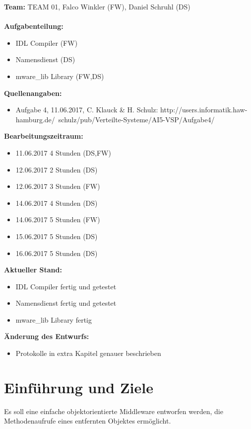 \documentclass{article}
\begin{document}
\textbf{Team:} TEAM 01, Falco Winkler (FW), Daniel Schruhl (DS)\\
\\
\textbf{Aufgabenteilung:}
\begin{itemize}
    \item IDL Compiler (FW)
    \item Namensdienst (DS)
    \item mware\_lib Library (FW,DS)
\end{itemize}

\textbf{Quellenangaben:}
\begin{itemize}
    \item Aufgabe 4, 11.06.2017, C. Klauck \& H. Schulz: \newline
    http://users.informatik.haw-hamburg.de/~schulz/pub/Verteilte-Systeme/AI5-VSP/Aufgabe4/
\end{itemize}

\textbf{Bearbeitungszeitraum:}
\begin{itemize}
	\item 11.06.2017 4 Stunden (DS,FW)
	\item 12.06.2017 2 Stunden (DS)
	\item 12.06.2017 3 Stunden (FW)
	\item 14.06.2017 4 Stunden (DS)
	\item 14.06.2017 5 Stunden (FW)
	\item 15.06.2017 5 Stunden (DS)
	\item 16.06.2017 5 Stunden (DS)
\end{itemize}

\textbf{Aktueller Stand:}
\begin{itemize}
	\item IDL Compiler fertig und getestet
    \item Namensdienst fertig und getestet
    \item mware\_lib Library fertig
\end{itemize}

\textbf{Änderung des Entwurfs:}
\begin{itemize}
    \item Protokolle in extra Kapitel genauer beschrieben
\end{itemize}

\newpage

\section{Einführung und Ziele}
Es soll eine einfache objektorientierte Middleware entworfen werden, die Methodenaufrufe
eines entfernten Objektes ermöglicht.\\
\end{document}
